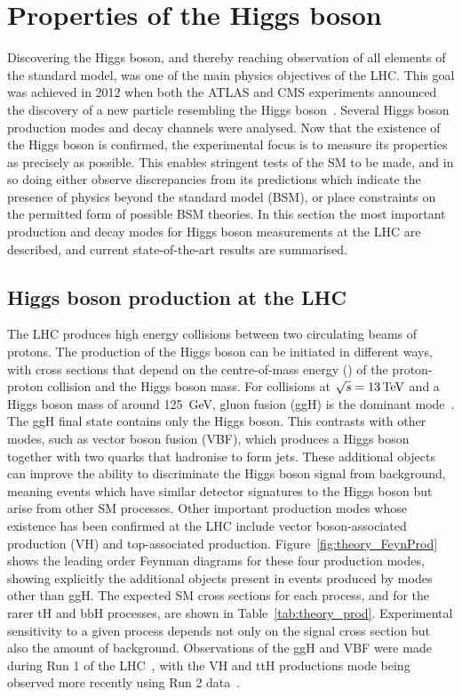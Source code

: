 \section{Properties of the Higgs boson}

Discovering the Higgs boson, and thereby reaching observation of all elements of the standard model, 
was one of the main physics objectives of the LHC. %
This goal was achieved in 2012 when both the ATLAS and CMS experiments 
announced the discovery of a new particle resembling the Higgs boson~\cite{ATLASdiscovery,CMSdiscovery}.
Several Higgs boson production modes and decay channels were analysed.
Now that the existence of the Higgs boson is confirmed, 
the experimental focus is to measure its properties as precisely as possible.
This enables stringent tests of the SM to be made, 
and in so doing either observe discrepancies from its predictions
which indicate the presence of physics beyond the standard model (BSM), 
or place constraints on the permitted form of possible BSM theories.
In this section the most important production and decay modes for Higgs boson measurements
at the LHC are described, and current state-of-the-art results are summarised.

\subsection{Higgs boson production at the LHC}

The LHC produces high energy collisions between two circulating beams of protons.
The production of the Higgs boson can be initiated in different ways, 
with cross sections that depend on the centre-of-mass energy (\sqrtS) of the proton-proton collision
and the Higgs boson mass.
For collisions at $\sqrt{s}=\SI{13}{TeV}$ and a Higgs boson mass of around \SI{125}{GeV}, 
gluon fusion (ggH) is the dominant mode~\cite{YR4}.
The ggH final state contains only the Higgs boson. 
This contrasts with other modes, such as vector boson fusion (VBF), 
which produces a Higgs boson together with two quarks that hadronise to form jets.
These additional objects can improve the ability to discriminate the Higgs boson signal 
from background, meaning events which have similar detector signatures to the Higgs boson
but arise from other SM processes.
Other important production modes whose existence has been confirmed at the LHC include 
vector boson-associated production (VH) and top-associated production.
Figure~\ref{fig:theory_FeynProd} shows the leading order Feynman diagrams 
for these four production modes, showing explicitly the additional objects present 
in events produced by modes other than ggH.
The expected SM cross sections for each process, and for the rarer tH and bbH processes, 
are shown in Table~\ref{tab:theory_prod}.
Experimental sensitivity to a given process depends not only on the signal cross section 
but also the amount of background.
Observations of the ggH and VBF were made during Run 1 
of the LHC~\cite{ATLAScouplingsRun1,CMScouplingsRun1,ATLASandCMScouplingsRun1}, 
with the VH and ttH productions mode being observed more recently 
using Run 2 data~\cite{ATLASttHobservation,CMSttHobservation,ATLASbbObservation,CMSbbObservation}.

